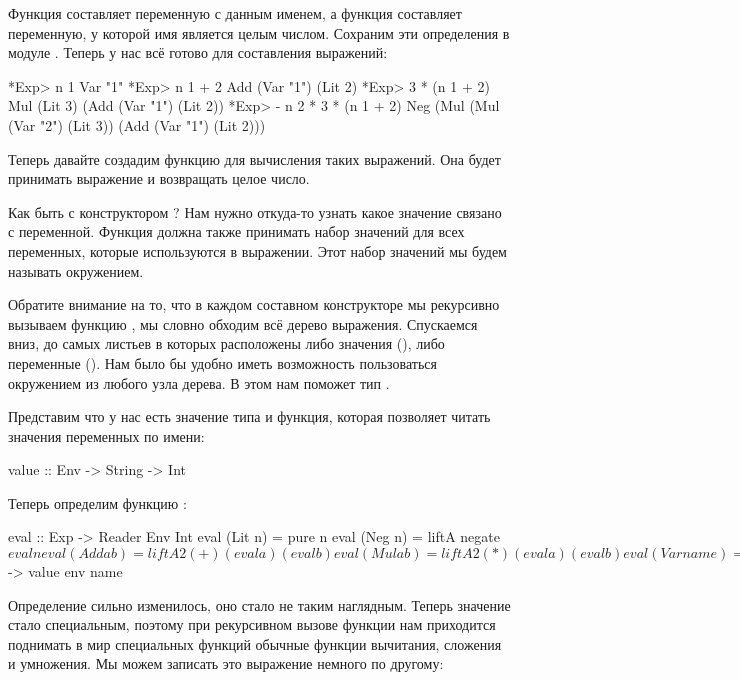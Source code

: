 Функция  составляет переменную с данным именем,
а функция  составляет переменную, у которой имя
является целым числом. Сохраним эти определения в модуле .
Теперь у нас всё готово для составления выражений:

\begin{code}
*Exp> n 1
Var "1"
*Exp> n 1 + 2
Add (Var "1") (Lit 2)
*Exp> 3 * (n 1 + 2)
Mul (Lit 3) (Add (Var "1") (Lit 2))
*Exp> - n 2 * 3 * (n 1 + 2)
Neg (Mul (Mul (Var "2") (Lit 3)) (Add (Var "1") (Lit 2)))
\end{code}

Теперь давайте создадим функцию для вычисления таких выражений.
Она будет принимать выражение и возвращать целое число.


Как быть с конструктором ? Нам нужно откуда-то
узнать какое значение связано с переменной. Функция
 должна также принимать набор значений
для всех переменных, которые используются в выражении. 
Этот набор значений мы будем называть окружением.

Обратите внимание на то, что в каждом составном конструкторе
мы рекурсивно вызываем функцию , мы словно обходим
всё дерево выражения. Спускаемся вниз, до самых листьев
в которых расположены либо значения (), либо переменные
(). Нам было бы удобно иметь возможность пользоваться
окружением из любого узла дерева. В этом нам поможет тип
.

Представим что у нас есть значение типа  и функция,
которая позволяет читать значения переменных по имени:

\begin{code}
value :: Env -> String -> Int
\end{code}

Теперь определим функцию :

\begin{code}
eval :: Exp -> Reader Env Int
eval (Lit n)    = pure n
eval (Neg n)    = liftA  negate $ eval n
eval (Add a b)  = liftA2 (+) (eval a) (eval b)
eval (Mul a b)  = liftA2 (*) (eval a) (eval b)
eval (Var name) = Reader $ \env -> value env name 
\end{code}

Определение сильно изменилось, оно стало не таким
наглядным. Теперь значение  стало специальным,
поэтому при рекурсивном вызове функции  нам
приходится поднимать в мир специальных функций
обычные функции вычитания, сложения
и умножения. Мы можем записать это выражение  
немного по другому:

